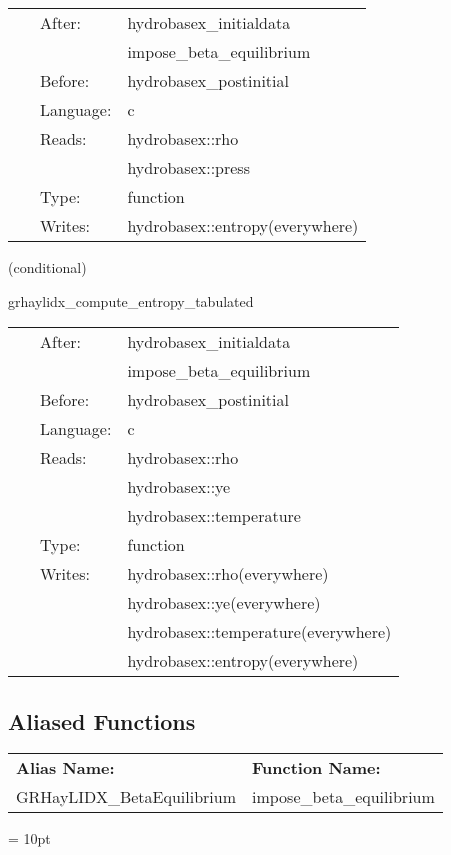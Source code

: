 \hspace{5mm}{\it computes entropy from density and pressure using hybrid eos } 


\hspace{5mm}

 \begin{tabular*}{160mm}{cll} 
~ & After:  & hydrobasex\_initialdata \\ 
~& ~ &impose\_beta\_equilibrium\\ 
~ & Before:  & hydrobasex\_postinitial \\ 
~ & Language:  & c \\ 
~ & Reads:  & hydrobasex::rho \\ 
~& ~ &hydrobasex::press\\ 
~ & Type:  & function \\ 
~ & Writes:  & hydrobasex::entropy(everywhere) \\ 
\end{tabular*} 


\vspace{5mm}

\noindent {\bf }   (conditional) 

\hspace{5mm} grhaylidx\_compute\_entropy\_tabulated 

\hspace{5mm}{\it computes entropy from density, y\_e, and temperature using tabulated eos } 


\hspace{5mm}

 \begin{tabular*}{160mm}{cll} 
~ & After:  & hydrobasex\_initialdata \\ 
~& ~ &impose\_beta\_equilibrium\\ 
~ & Before:  & hydrobasex\_postinitial \\ 
~ & Language:  & c \\ 
~ & Reads:  & hydrobasex::rho \\ 
~& ~ &hydrobasex::ye\\ 
~& ~ &hydrobasex::temperature\\ 
~ & Type:  & function \\ 
~ & Writes:  & hydrobasex::rho(everywhere) \\ 
~& ~ &hydrobasex::ye(everywhere)\\ 
~& ~ &hydrobasex::temperature(everywhere)\\ 
~& ~ &hydrobasex::entropy(everywhere)\\ 
\end{tabular*} 


\subsection*{Aliased Functions}

\hspace{5mm}

 \begin{tabular*}{160mm}{ll} 

{\bf Alias Name:} ~~~~~~~ & {\bf Function Name:} \\ 
GRHayLIDX\_BetaEquilibrium & impose\_beta\_equilibrium \\ 
\end{tabular*} 



\vspace{5mm}\parskip = 10pt 
